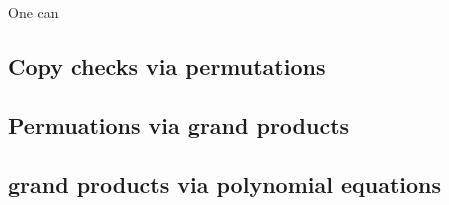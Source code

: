 \documentclass[11pt]{article} %
\begin{document}
One can 


\subsection{Copy checks via permutations}






\subsection{Permuations via grand products}



\subsection{grand products via polynomial equations}
\end{document}
